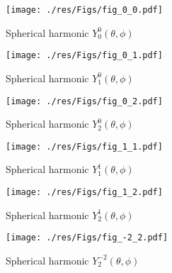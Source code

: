 \documentclass[titlepage]{article}
\begin{document}
    



    \begin{figure}[ht]
      \centering
      \texttt{[image: ./res/Figs/fig\_0\_0.pdf]}
      \caption{Spherical harmonic $Y^0_0(\theta,\phi)$}
      \label{fig:00}
    \end{figure}




    \begin{figure}[ht]
      \centering
      \texttt{[image: ./res/Figs/fig\_0\_1.pdf]}
      \caption{Spherical harmonic $Y^0_1(\theta,\phi)$}
      \label{fig:01}
    \end{figure}

    


    \begin{figure}[ht]
      \centering
      \texttt{[image: ./res/Figs/fig\_0\_2.pdf]}
      \caption{Spherical harmonic $Y^0_2(\theta,\phi)$}
      \label{fig:02}
    \end{figure}




    \begin{figure}[ht]
      \centering
      \texttt{[image: ./res/Figs/fig\_1\_1.pdf]}
      \caption{Spherical harmonic $Y^1_1(\theta,\phi)$}
      \label{fig:11}
    \end{figure}




    \begin{figure}[ht]
      \centering
      \texttt{[image: ./res/Figs/fig\_1\_2.pdf]}
      \caption{Spherical harmonic $Y^1_2(\theta,\phi)$}
      \label{fig:12}
    \end{figure}



    \begin{figure}[ht]
      \centering
      \texttt{[image: ./res/Figs/fig\_-2\_2.pdf]}
      \caption{Spherical harmonic $Y^{-2}_2(\theta,\phi)$}
      \label{fig:-22}
    \end{figure}
    

    

    
\end{document}
